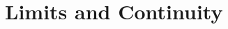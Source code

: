 \documentclass[../abcalc.tex]{subfiles}
\begin{document}
\chapter{Limits and Continuity}
\end{document}
